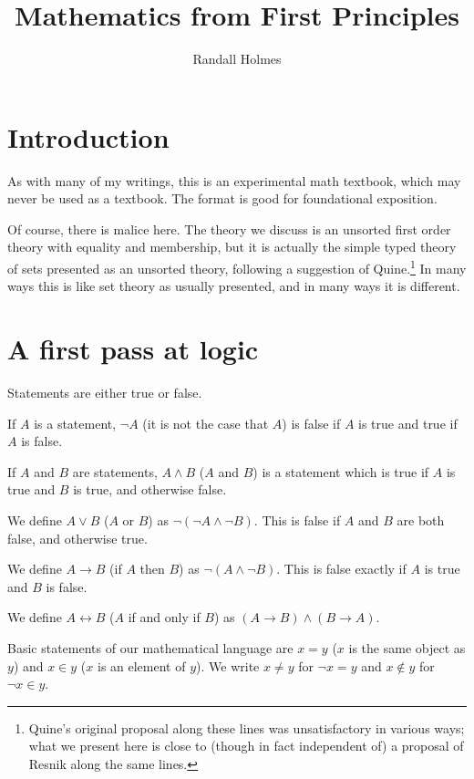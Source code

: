\documentclass[12pt]{article}
\title{Mathematics from First Principles}
\author{Randall Holmes}
\begin{document}
\maketitle

\tableofcontents

\newpage

\section{Introduction}

As with many of my writings, this is an experimental math textbook, which may never be used as a textbook.  The format is good for foundational exposition.

Of course, there is malice here.  The theory we discuss is an unsorted first order theory with equality and membership, but it is actually the simple typed theory of sets presented as an unsorted theory, following a suggestion of Quine.\footnote{Quine's original proposal along these lines was unsatisfactory in various ways;  what we present here is close to (though in fact independent of) a proposal of Resnik along the same lines.}  In many ways this is like set theory as usually presented, and in many ways it is different.

\newpage

\section{A first pass at logic}

Statements are either true or false.

If $A$ is a statement, $\neg A$ (it is not the case that $A$) is false if $A$ is true and true if $A$ is false.

If $A$ and $B$ are statements, $A \wedge B$ ($A$ and $B$)  is a statement which is true if $A$ is true and $B$ is true, and otherwise false.

We define $A \vee B$ ($A$ or $B$) as $\neg(\neg A \wedge \neg B)$.  This is false if $A$ and $B$ are both false, and otherwise true.

We define $A \rightarrow B$ (if $A$ then $B$) as $\neg(A \wedge \neg B)$.  This is false exactly if $A$ is true and $B$ is false.

We define $A \leftrightarrow B$ ($A$ if and only if $B$) as $(A \rightarrow B) \wedge (B \rightarrow A)$.

Basic statements of our mathematical language are $x=y$ ($x$ is the same object as $y$) and $x \in y$ ($x$ is an element of $y$).  We write $x \neq y$ for
$\neg x=y$ and $x \not\in y$ for $\neg x \in y$.
\end{document}
